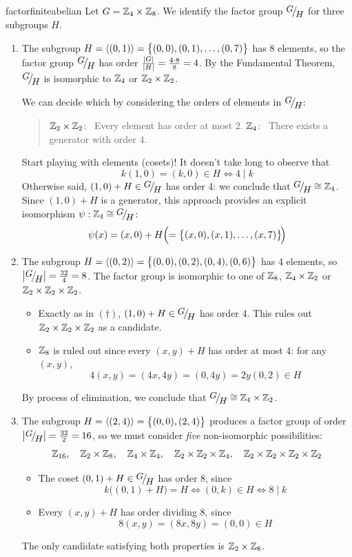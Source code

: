\begin{examples}{}{factorfiniteabelian}
	Let $G=\mathbb{Z}_4\times\mathbb{Z}_8$. We identify the factor group $\quotient GH$ for three subgroups $H$.
	\begin{enumerate}
	  \item The subgroup $H=\left\langle (0,1)\right\rangle=\bigl\{(0,0),(0,1),\ldots,(0,7)\bigr\}$ has 8 elements, so the factor group $\quotient GH$ has order $\frac{\left| G\right|}{\left| H\right|}=\frac{4\cdot 8}8=4$. By the Fundamental Theorem, $\quotient GH$ is isomorphic to $\mathbb{Z}_4$ or $\mathbb{Z}_2\times\mathbb{Z}_2$.\par
	  We can decide which by considering the orders of elements in $\quotient GH$:
	  \begin{quote}
	  	$\mathbb{Z}_2\times\mathbb{Z}_2$: \ Every element has order at most 2.\smallbreak
	  	$\mathbb{Z}_4$: \ There exists a generator with order 4.
	  \end{quote}
	  Start playing with elements (cosets)! It doesn't take long to observe that
	  \[
	  	k(1,0)=(k,0)\in H\iff 4\mid k \tag{$\dag$}
	  \]
	  Otherwise said, $(1,0)+H\in\quotient GH$ has order 4: we conclude that $\quotient GH\cong\Z_4$. Since $(1,0)+H$ is a generator, this approach provides an explicit isomorphism $\psi:\Z_4\cong\quotient GH$:
	  \[
	  	\psi(x)= (x,0)+H \hfill \Bigl(=\bigl\{ (x,0),(x,1),\ldots,(x,7)\bigr\}\!\Bigr)
		\] 	  

	  \item The subgroup $H=\left\langle (0,2)\right\rangle=\bigl\{(0,0),(0,2),(0,4),(0,6)\bigr\}$ has 4 elements, so $\nm{\quotient GH}=\frac{32}4=8$. The factor group is isomorphic to one of $\mathbb{Z}_8$, $\mathbb{Z}_4\times\mathbb{Z}_2$ or $\mathbb{Z}_2\times\mathbb{Z}_2\times\mathbb{Z}_2$.
	  \begin{itemize}
	    \item Exactly as in $(\dag)$, $(1,0)+H\in \quotient GH$ has order 4. This rules out $\mathbb{Z}_2\times\mathbb{Z}_2\times\mathbb{Z}_2$ as a candidate.
	    \item $\mathbb{Z}_8$ is ruled out since every $(x,y)+H$ has order at most 4: for any $(x,y)$,
	  	\[
	  		4(x,y) =(4x,4y) =(0,4y) =2y(0,2)\in H
	  	\]
	  \end{itemize}
	  By process of elimination, we conclude that $\quotient GH\cong\Z_4\times\Z_2$.

		\item\label{ex:factoriso3} The subgroup $H=\left\langle (2,4)\right\rangle=\bigl\{(0,0),(2,4)\bigr\}$ produces a factor group of order $\nm{\quotient GH}=\frac{32}2=16$, so we must consider \emph{five} non-isomorphic possibilities:
		\[
			\mathbb{Z}_{16},\quad \mathbb{Z}_2\times\mathbb{Z}_8,\quad \mathbb{Z}_4\times\mathbb{Z}_4,\quad \mathbb{Z}_2\times\mathbb{Z}_2\times\mathbb{Z}_4,\quad \mathbb{Z}_2\times\mathbb{Z}_2\times\mathbb{Z}_2\times\mathbb{Z}_2
		\]
		\begin{itemize}
	    \item The coset $(0,1)+H\in\quotient GH$ has order 8, since
	    \[
				k\bigl((0,1)+H\bigr)=H\iff (0,k)\in H\iff 8\mid k
			\]
			\item Every $(x,y)+H$ has order dividing 8, since
			\[
				8(x,y)=(8x,8y)=(0,0)\in H
			\]
	  \end{itemize}
	  The only candidate satisfying both properties is $\mathbb{Z}_2\times\mathbb{Z}_8$.
	\end{enumerate}
\end{examples}


